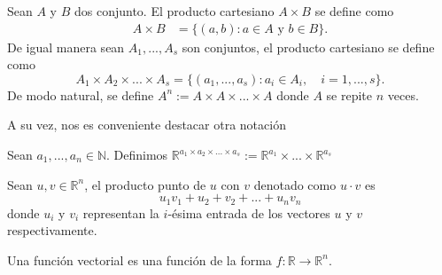     \begin{definition}
        Sean $A$ y $B$ dos conjunto. El producto cartesiano $A \times B$ se define como
        \begin{eqnarray}
            A \times B &= \{(a,b) : a\in A \text{ y } b\in B\}.
        \end{eqnarray}
        De igual manera sean $A_1, ..., A_s$ son conjuntos, el producto cartesiano se define como
        \begin{equation}
            A_1\times A_2 \times ... \times A_s = \{(a_1,..., a_s): a_i\in A_i, \quad i= 1,...,s\}.
        \end{equation}
        De modo natural, se define $A^n :=  A \times A \times ... \times A$ donde $A$ se repite $n$ veces.
    \end{definition}
    A su vez, nos es conveniente destacar otra notación
    
    \begin{notation}
        Sean $a_1, ..., a_n\in \mathbb N$. Definimos $\mathbb R^{a_1 \times a_2 \times ... \times a_s} := \mathbb R^{a_1} \times ... \times \mathbb R^{a_s}$
    \end{notation}

    \begin{definition}
        Sean $u,v\in \mathbb R^n$, el producto punto de $u$ con $v$ denotado como $u\cdot v$ es
        \begin{equation}
            u_1v_1 + u_2+v_2 + ... + u_nv_n
        \end{equation}
        donde $u_i$ y $v_i$ representan la $i$-ésima entrada de los vectores $u$ y $v$ respectivamente.
    \end{definition}

    \begin{definition}
        Una función vectorial es una función de la forma $f:\mathbb R \to \mathbb R^n$.
    \end{definition}

